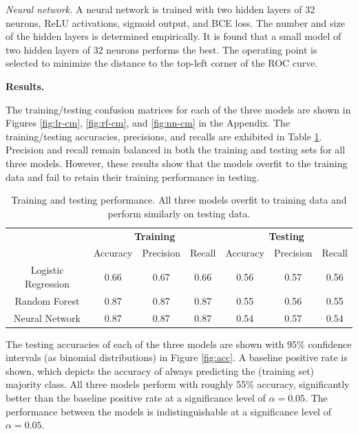 \documentclass[11pt]{article}
\begin{document}
\textit{Neural network.} A neural network is trained with two hidden layers of 32 neurons, ReLU activations, sigmoid output, and BCE loss. The number and size of the hidden layers is determined empirically. It is found that a small model of two hidden layers of 32 neurons performs the best. The operating point is selected to minimize the distance to the top-left corner of the ROC curve.

\textbf{Results.}

The training/testing confusion matrices for each of the three models are shown in Figures \ref{fig:lr-cm}, \ref{fig:rf-cm}, and \ref{fig:nn-cm} in the Appendix. The training/testing accuracies, precisions, and recalls are exhibited in Table \ref{tab:performance}. Precision and recall remain balanced in both the training and testing sets for all three models. However, these results show that the models overfit to the training data and fail to retain their training performance in testing.

\begin{table}[h!]
\centering
\begin{tabular}{c|ccc|ccc}
    & \multicolumn{3}{c|}{\textbf{Training}} & \multicolumn{3}{c}{\textbf{Testing}} \\ 
    & Accuracy & Precision & Recall & Accuracy & Precision & Recall \\ 
    \hline
    Logistic Regression & 0.66 & 0.67 & 0.66 & 0.56 & 0.57 & 0.56 \\ 
    Random Forest & 0.87 & 0.87 & 0.87 & 0.55 & 0.56 & 0.55 \\ 
    Neural Network & 0.87 & 0.87 & 0.87 & 0.54 & 0.57 & 0.54 \\ 
\end{tabular}
\caption{Training and testing performance. All three models overfit to training data and perform similarly on testing data.}
\label{tab:performance}
\end{table}

The testing accuracies of each of the three models are shown with 95\% confidence intervals (as binomial distributions) in Figure \ref{fig:acc}. A baseline positive rate is shown, which depicts the accuracy of always predicting the (training set) majority class. All three models perform with roughly 55\% accuracy, significantly better than the baseline positive rate at a significance level of $\alpha = 0.05$. The performance between the models is indistinguishable at a significance level of $\alpha = 0.05$.
\end{document}
